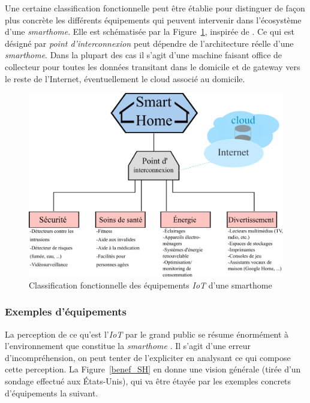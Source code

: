 \documentclass[]{article}
\begin{document}
\par Une certaine classification fonctionnelle peut être établie pour distinguer de façon plus concrète les différents équipements qui peuvent intervenir dans l'écosystème d'une \textit{smarthome}. Elle est schématisée par la Figure~\ref{sm_class}, inspirée de \cite{Basman2016}. Ce qui est désigné par \textit{point d'interconnexion} peut dépendre de l'architecture réelle d'une \textit{smarthome}. Dans la plupart des cas il s'agit d'une machine faisant office de collecteur pour toutes les données transitant dans le domicile et de gateway vers le reste de l'Internet, éventuellement le cloud associé au domicile.\\


\begin{figure}[!h]
\centering
\includegraphics[scale=1.3]{smarthome_class.png}
\caption{Classification fonctionnelle des équipements \textit{IoT} d'une smarthome}
\label{sm_class}
\end{figure}

\newpage

\subsubsection{Exemples d'équipements}

La perception de ce qu'est l'\textit{IoT} par le grand public se résume énormément à l'environnement que constitue la \textit{smarthome} \cite{Berte2018}. Il s'agit d'une erreur d'incompréhension, on peut tenter de l'expliciter en analysant ce qui compose cette perception. La Figure~\ref{benef_SH} en donne une vision générale (tirée d'un sondage effectué aux États-Unis), qui va être étayée par les exemples concrets d'équipements la suivant.
\end{document}
